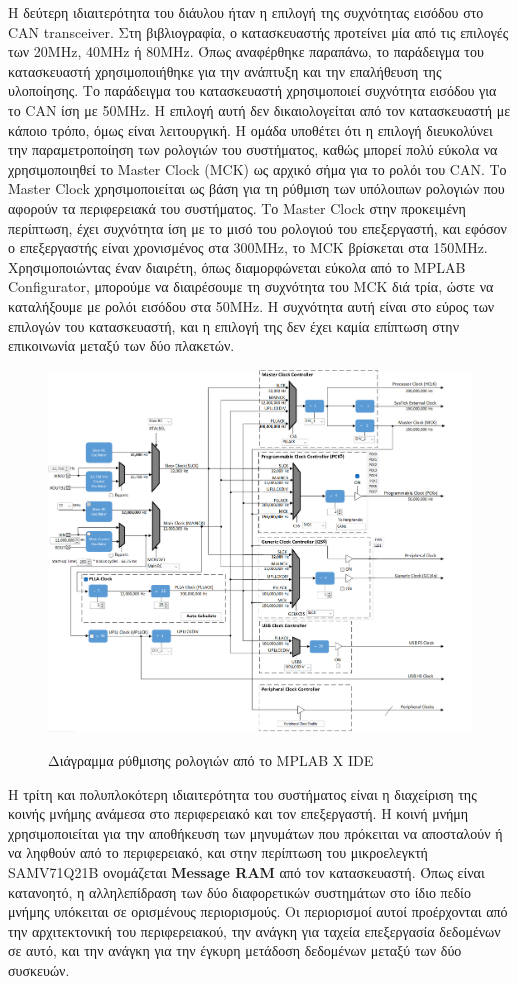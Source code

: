 \documentclass[a4paper,nobib,justified]{tufte-book}
\begin{document}
Η δεύτερη ιδιαιτερότητα του διάυλου ήταν η επιλογή της συχνότητας εισόδου στο CAN transceiver. Στη βιβλιογραφία, ο κατασκευαστής προτείνει μία από τις επιλογές των 20MHz, 40MHz ή 80MHz. Όπως αναφέρθηκε παραπάνω, το παράδειγμα του κατασκευαστή χρησιμοποιήθηκε για την ανάπτυξη και την επαλήθευση της υλοποίησης. Το παράδειγμα του κατασκευαστή χρησιμοποιεί συχνότητα εισόδου για το CAN ίση με 50MHz. Η επιλογή αυτή δεν δικαιολογείται από τον κατασκευαστή με κάποιο τρόπο, όμως είναι λειτουργική. Η ομάδα υποθέτει ότι η επιλογή διευκολύνει την παραμετροποίηση των ρολογιών του συστήματος, καθώς μπορεί πολύ εύκολα να χρησιμοποιηθεί το Master Clock (MCK) ως αρχικό σήμα για το ρολόι του CAN. Το Master Clock χρησιμοποιείται ως βάση για τη ρύθμιση των υπόλοιπων ρολογιών που αφορούν τα περιφερειακά του συστήματος. Το Master Clock στην προκειμένη περίπτωση, έχει συχνότητα ίση με το μισό του ρολογιού του επεξεργαστή, και εφόσον ο επεξεργαστής είναι χρονισμένος στα 300MHz, το MCK βρίσκεται στα 150MHz. Χρησιμοποιώντας έναν διαιρέτη, όπως διαμορφώνεται εύκολα από το MPLAB Configurator, μπορούμε να διαιρέσουμε τη συχνότητα του MCK διά τρία, ώστε να καταλήξουμε με ρολόι εισόδου στα 50MHz. Η συχνότητα αυτή είναι στο εύρος των επιλογών του κατασκευαστή, και η επιλογή της δεν έχει καμία επίπτωση στην επικοινωνία μεταξύ των δύο πλακετών.

\begin{figure}
	\includegraphics[width=0.8\linewidth]{media/images/mplab-clock-diagram.png}
	\label{fig:mplab-clock}
	\caption{Διάγραμμα ρύθμισης ρολογιών από το MPLAB X IDE}
\end{figure}

Η τρίτη και πολυπλοκότερη ιδιαιτερότητα του συστήματος είναι η διαχείριση της κοινής μνήμης ανάμεσα στο περιφερειακό και τον επεξεργαστή. Η κοινή μνήμη χρησιμοποιείται για την αποθήκευση των μηνυμάτων που πρόκειται να αποσταλούν ή να ληφθούν από το περιφερειακό, και στην περίπτωση του μικροελεγκτή SAMV71Q21B ονομάζεται \textbf{Message RAM}  από τον κατασκευαστή. Όπως είναι κατανοητό, η αλληλεπίδραση των δύο διαφορετικών συστημάτων στο ίδιο πεδίο μνήμης υπόκειται σε ορισμένους περιορισμούς. Οι περιορισμοί αυτοί προέρχονται από την αρχιτεκτονική του περιφερειακού, την ανάγκη για ταχεία επεξεργασία δεδομένων σε αυτό, και την ανάγκη για την έγκυρη μετάδοση δεδομένων μεταξύ των δύο συσκευών.
\end{document}
